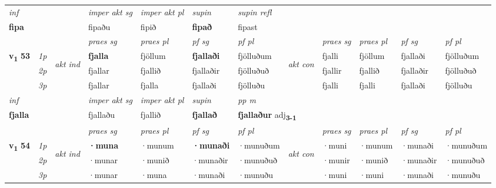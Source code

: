 \begin{longtable}[l]{X>{\footnotesize\itshape}llXXXXlXXXX}
\cmidrule{4-7}
   {\textit{inf}} & &  & \textit{imper akt sg} & \textit{imper akt pl}    & \textit{supin} & \textit{supin refl}  \\*
  {\textbf{fipa}} & && fipaðu  & fipið    &  \textbf{fipað} & fipast  \\*

\midrule

 & &   & \textit{praes sg}  & \textit{praes pl}    & \textit{ pf sg} & \textit{pf pl} & & \textit{praes sg}  & \textit{praes pl}    & \textit{pf sg} & \textit{pf pl }  \\ \cmidrule{4-7} \cmidrule{9-12}
 \multirow{2}{*}{{{\textbf{v{\textsubscript{1}}} \Large{\textbf{53}}}}}  & 1p & \multirow{3}{*}{\begin{turn}{90}\textit{akt ind}\end{turn}} & \textbf{fjalla} & fjöllum & \textbf{fjallaði} & fjölluðum & \multirow{3}{*}{\begin{turn}{90}\textit{akt con}\end{turn}} &fjalli & fjöllum & fjallaði & fjölluðum\\*
 & 2p &  &  fjallar  & fjallið & fjallaðir & fjölluðuð & & fjallir & fjallið & fjallaðir & fjölluðuð \\*
 & 3p &  & fjallar & fjalla & fjallaði & fjölluðu & & fjalli & fjalli& fjallaði & fjölluðu \\*
\cmidrule{4-7} \cmidrule{9-12}

   {\textit{inf}} & &  & \textit{imper akt sg} & \textit{imper akt pl}    & \textit{supin}  & \textit{pp m} \\*
  {\textbf{fjalla}} & && fjallaðu  & fjallið    &  \textbf{fjallað}  & \multicolumn{2}{l}{\textbf{fjallaður} adj\textbf{\textsubscript{3-1}}} \\*

\midrule

 & &   & \textit{praes sg}  & \textit{praes pl}    & \textit{ pf sg} & \textit{pf pl} & & \textit{praes sg}  & \textit{praes pl}    & \textit{pf sg} & \textit{pf pl }  \\ \cmidrule{4-7} \cmidrule{9-12}
 \multirow{2}{*}{{{\textbf{v{\textsubscript{1}}} \Large{\textbf{54}}}}}  & 1p & \multirow{3}{*}{\begin{turn}{90}\textit{akt ind}\end{turn}} & \textbf{·muna} & ·munum & \textbf{·munaði} & ·munuðum & \multirow{3}{*}{\begin{turn}{90}\textit{akt con}\end{turn}} &·muni & ·munum & ·munaði & ·munuðum\\*
 & 2p &  &  ·munar  & ·munið & ·munaðir & ·munuðuð & & ·munir & ·munið & ·munaðir & ·munuðuð \\*
 & 3p &  & ·munar & ·muna & ·munaði & ·munuðu & & ·muni & ·muni& ·munaði & ·munuðu \\*
\cmidrule{4-7} \cmidrule{9-12}


\end{longtable}
